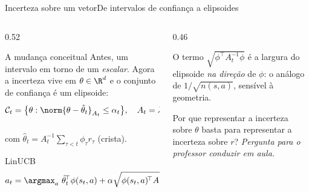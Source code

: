 \documentclass[aspectratio=169, 11pt]{beamer}
\newcommand{\paradiscussao}{\smallskip
  {\footnotesize\color{rlCinza}\itshape Pergunta para o professor conduzir em aula.}}
\newcommand{\feat}{\phi}
\begin{document}
\begin{frame}{Incerteza sobre um vetor}{De intervalos de confiança a elipsoides}
  \begin{columns}[T]
    \begin{column}{0.52\textwidth}
      \begin{defbox}{A mudança conceitual}
        Antes, um intervalo em torno de um \emph{escalar}. Agora a incerteza vive em
        $\theta \in \R^d$ e o conjunto de confiança é um \alert{elipsoide}:
        \vspace{-0.7em}
        \[
          \mathcal{C}_t = \bigl\{\theta : \norm{\theta - \hat\theta_t}_{A_t} \le \alpha_t \bigr\},
          \quad
          A_t = \lambda I + \sum_{\tau < t}\feat_\tau \feat_\tau^{\!\top},
        \]
        \vspace{-1.1em}

        com $\hat\theta_t = A_t^{-1}\sum_{\tau<t}\feat_\tau r_\tau$ (crista).
      \end{defbox}
      \begin{algbox}{LinUCB}
        \vspace{-0.9em}
        \[
          a_t = \argmax_{a}\ \hat\theta_t^{\!\top}\feat(s_t,a)
          + \alpha \sqrt{\feat(s_t,a)^{\!\top} A_t^{-1}\feat(s_t,a)}
        \]
        \vspace{-1.3em}
      \end{algbox}
    \end{column}
    \begin{column}{0.46\textwidth}
      \begin{ideiabox}
        O termo $\sqrt{\feat^{\!\top}A_t^{-1}\feat}$ é a largura do elipsoide \emph{na
        direção} de $\feat$: o análogo de $1/\sqrt{n(s,a)}$, sensível à geometria.
      \end{ideiabox}
      \begin{quizbox}{}
        Por que representar a incerteza sobre $\theta$ basta para representar a
        incerteza sobre $r$?
        \paradiscussao
      \end{quizbox}
    \end{column}
  \end{columns}
\end{frame}
\end{document}
